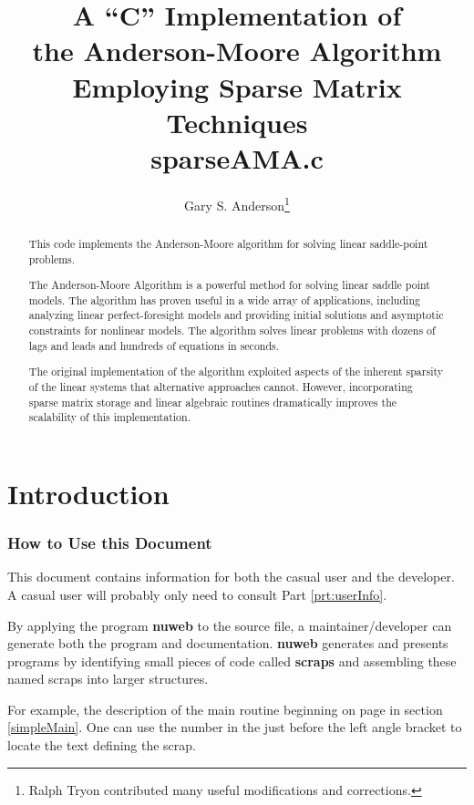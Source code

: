 \documentclass[12pt]{article}
\title{A ``C'' Implementation of \\ the Anderson-Moore Algorithm\\
Employing Sparse Matrix Techniques\\sparseAMA.c}
\author{Gary S. Anderson\thanks{Ralph Tryon contributed many useful modifications and corrections.}}
\begin{document}
\maketitle
\begin{abstract}
  This code implements the Anderson-Moore algorithm for solving
 linear saddle-point problems.


The Anderson-Moore Algorithm is a powerful method for 
solving linear saddle point
 models. The algorithm has proven useful in a wide array of 
applications, including
 analyzing linear perfect-foresight models and 
providing initial solutions and
 asymptotic constraints for nonlinear models. The algorithm 
solves linear problems with
 dozens of lags and leads and hundreds of equations in seconds. 

The original implementation of the
algorithm exploited aspects of the inherent
sparsity of the linear systems that alternative approaches
cannot. However, incorporating sparse matrix storage and linear
algebraic routines dramatically improves the scalability of this implementation.

\end{abstract}
\newpage
{}
\part{Introduction}
\section{How to Use this Document}
\label{sec:how}
This document contains information for both the casual user and the developer.
A casual user will probably only need to consult Part \ref{prt:userInfo}.

By applying the program {\bf nuweb} to the source file,
 a maintainer/developer can generate
both the program and documentation.
{\bf nuweb } generates and presents programs by identifying small pieces
of code called {\bf scraps} and assembling these named scraps into
larger structures.

For example, the description of the main routine beginning 
on page \pageref{simpleMain}
in section \ref{simpleMain}.
One can use the number in the just before the left angle bracket to locate
the text defining the scrap.
\end{document}

